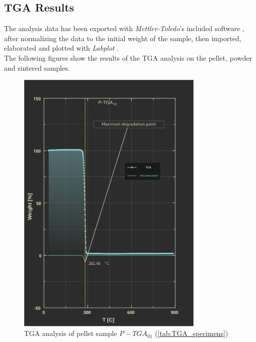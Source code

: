 \documentclass{article}
\begin{document}
        \subsection{TGA Results\label{TGA_Results}}
        The analysis data has been exported with \textit{Mettler-Toledo}'s included software \autocites{Mettler_Toledo}, after normalizing the data to the initial weight of the sample,
        then imported, elaborated and plotted with \textit{Labplot} \autocites{Labplot}. \\
        The following figures show the results of the TGA analysis on the pellet, powder and sintered samples. \\ 
        \begin{figure}[h!]
            \centering
            \includegraphics[width=0.8\textwidth]{Pictures/Thermal_analysis_plots/TGA_catalogued/P-TGA01.eps}
            \caption{TGA analysis of pellet sample $P-TGA_{01}$ (\ref{tab:TGA_specimens})}
            \label{fig:TGA_01}
        \end{figure}
\end{document}
